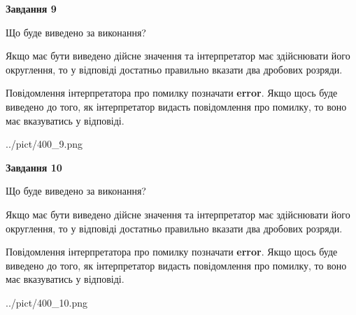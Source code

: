 \documentclass[12pt, ukrainian]{article}
\begin{document}
{\begin {Large}
{\begin {center}\textbf{Завдання 9}\end {center}}\par
Що буде виведено за виконання? \par

Якщо має бути виведено дійсне значення та інтерпретатор має здійснювати його округлення, 
то у відповіді достатньо правильно вказати два дробових розряди.

Повідомлення інтерпретатора про помилку позначати \textbf{error}.
Якщо щось буде виведено до того, як інтерпретатор видасть повідомлення про помилку, 
то воно має вказуватись у відповіді. \par

\begin{center}
	{../pict/400_9.png}
\end{center}
\newpage

{\begin {center}\textbf{Завдання 10}\end {center}}\par
Що буде виведено за виконання? \par

Якщо має бути виведено дійсне значення та інтерпретатор має здійснювати його округлення, 
то у відповіді достатньо правильно вказати два дробових розряди.

Повідомлення інтерпретатора про помилку позначати \textbf{error}.
Якщо щось буде виведено до того, як інтерпретатор видасть повідомлення про помилку, 
то воно має вказуватись у відповіді. \par

\begin{center}
	{../pict/400_10.png}
\end{center}
\newpage

\end {Large}}
\end{document}
